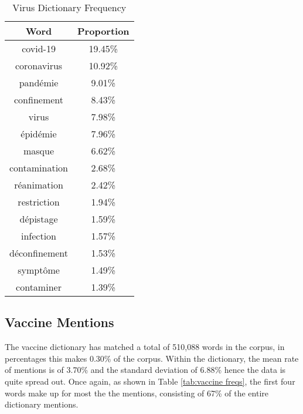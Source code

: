 \begin{table}[H]
\caption{Virus Dictionary Frequency}
\label{tab:virus freqs}
\centering
\begin{tabular}{@{}cc@{}}
\toprule
Word      & Proportion \\ \midrule
covid-19      & 19.45\% \\
coronavirus   & 10.92\% \\
pandémie      & 9.01\%  \\
confinement   & 8.43\%  \\
virus         & 7.98\%  \\
épidémie      & 7.96\%  \\
masque        & 6.62\%  \\
contamination & 2.68\%  \\
réanimation   & 2.42\%  \\
restriction   & 1.94\%  \\
dépistage     & 1.59\%  \\
infection     & 1.57\%  \\
déconfinement & 1.53\%  \\
symptôme      & 1.49\%  \\
contaminer    & 1.39\%  \\ \bottomrule
\end{tabular}
\end{table}

\subsection{Vaccine Mentions}

The vaccine dictionary has matched a total of 510,088 words in the corpus, in percentages this makes 0.30\% of the corpus. Within the dictionary, the mean rate of mentions is of 3.70\% and the standard deviation of 6.88\% hence the data is quite spread out. Once again, as shown in Table \ref{tab:vaccine freqs}, the first four words make up for most the the mentions, consisting of 67\% of the entire dictionary mentions.

